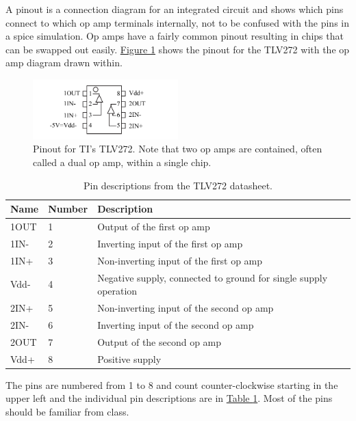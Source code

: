 A pinout is a connection diagram for an integrated circuit and shows which pins connect to which op amp terminals internally, not to be confused with the pins in a spice simulation. Op amps have a fairly common pinout resulting in chips that can be swapped out easily. \hyperref[fig:pinout]{Figure \ref*{fig:pinout}} shows the pinout for the TLV272 with the op amp diagram drawn within. 

\begin{figure} [h]
	\centering
		\includegraphics[width=0.5\textwidth]{Lab5pinout.pdf}
	\caption{Pinout for TI's TLV272. Note that two op amps are contained, often called a dual op amp, within a single chip.} \label{fig:pinout}
\end{figure}


\begin{table}[h]
\begin{center}
\begin{tabular}{|l|l|l|}
	\hline
	\textbf{Name} & \textbf{Number} & \textbf{Description} \\ \hline
	1OUT & 1 & Output of the first op amp \\ \hline
	1IN- & 2 & Inverting input of the first op amp \\ \hline
	1IN+ & 3 & Non-inverting input of the first op amp \\ \hline
	Vdd- & 4 & Negative supply, connected to ground for single supply operation \\ \hline
	2IN+ & 5 & Non-inverting input of the second op amp \\ \hline
	2IN- & 6 & Inverting input of the second op amp \\ \hline
	2OUT & 7 & Output of the second op amp \\ \hline
	Vdd+ & 8 & Positive supply \\ 
	\hline 
\end{tabular}
\end{center}
\caption{Pin descriptions from the TLV272 datasheet.}
\label{tbl:TLV272pinout}
\end{table}


The pins are numbered from 1 to 8 and count counter-clockwise starting in the upper left and the individual pin descriptions are in \hyperref[tbl:TLV272pinout]{Table \ref*{tbl:TLV272pinout}}. Most of the pins should be familiar from class.

